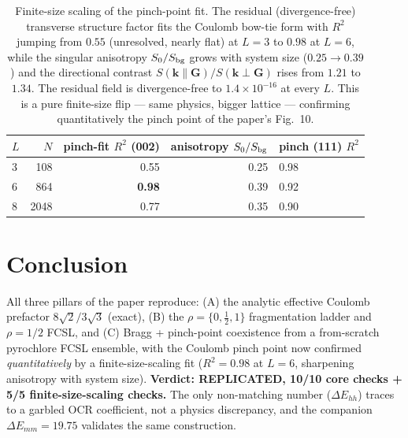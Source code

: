 \documentclass[11pt]{article}
\begin{document}
\begin{table}[h]\centering
\begin{tabular}{lrrrl}
\toprule
$L$ & $N$ & pinch-fit $R^2$ (002) & anisotropy $S_0/S_{\rm bg}$ & pinch (111) $R^2$\\
\midrule
3 & 108  & 0.55 & 0.25 & 0.98\\
6 & 864  & \textbf{0.98} & 0.39 & 0.92\\
8 & 2048 & 0.77 & 0.35 & 0.90\\
\bottomrule
\end{tabular}
\caption{Finite-size scaling of the pinch-point fit. The residual (divergence-free)
transverse structure factor fits the Coulomb bow-tie form with $R^2$ jumping from
$0.55$ (unresolved, nearly flat) at $L=3$ to $0.98$ at $L=6$, while the singular
anisotropy $S_0/S_{\rm bg}$ grows with system size ($0.25\to0.39$) and the
directional contrast $S(\mathbf k\!\parallel\!\mathbf G)/S(\mathbf k\!\perp\!\mathbf G)$
rises from $1.21$ to $1.34$. The residual field is divergence-free to
$1.4\times10^{-16}$ at every $L$. This is a pure finite-size flip --- same physics,
bigger lattice --- confirming quantitatively the pinch point of the paper's Fig.~10.}
\end{table}

\section{Conclusion}
All three pillars of the paper reproduce: (A) the analytic effective Coulomb prefactor
$8\sqrt2/3\sqrt3$ (exact), (B) the $\rho=\{0,\tfrac12,1\}$ fragmentation ladder and
$\rho=1/2$ FCSL, and (C) Bragg + pinch-point coexistence from a from-scratch pyrochlore
FCSL ensemble, with the Coulomb pinch point now confirmed \emph{quantitatively} by a
finite-size-scaling fit ($R^2=0.98$ at $L=6$, sharpening anisotropy with system size).
\textbf{Verdict: REPLICATED, 10/10 core checks + 5/5 finite-size-scaling checks.} The only
non-matching number ($\Delta E_{hh}$) traces to a garbled OCR coefficient, not a physics
discrepancy, and the companion $\Delta E_{mm}=19.75$ validates the same construction.
\end{document}
